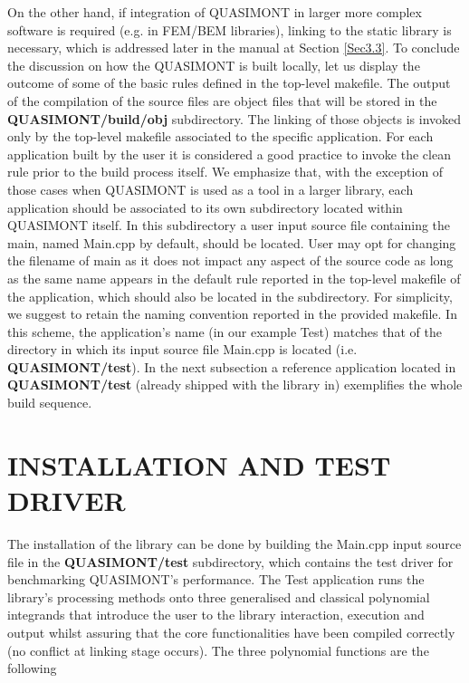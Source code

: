\documentclass[a4paper, twosided]{book}
\begin{document}
\noindent
On the other hand, if integration of QUASIMONT in larger more complex software is required (e.g. in FEM/BEM libraries), linking to the static library is necessary, which is addressed later in the manual at Section \ref{Sec3.3}. To conclude the discussion on how the QUASIMONT is built locally, let us display the outcome of some of the basic rules defined in the top-level \colorbox{poliGrayBlue}{makefile}. The output of the compilation of the source files are object files that will be stored in the \colorbox{poliGrayBlue}{\textbf{QUASIMONT/build/obj}} subdirectory. The linking of those objects is invoked only by the top-level makefile associated to the specific application. For each application built by the user it is considered a good practice to invoke the \colorbox{poliGrayBlue}{clean} rule prior to the build process itself. We emphasize that, with the exception of those cases when QUASIMONT is used as a tool in a larger library, each application should be associated to its own subdirectory located within QUASIMONT itself. In this subdirectory a user input source file containing the \colorbox{poliGrayBlue}{main}, named \colorbox{poliGrayBlue}{Main.cpp} by default, should be located. User may opt for changing the filename of \colorbox{poliGrayBlue}{main} as it does not impact any aspect of the source code as long as the same name appears in the \colorbox{poliGrayBlue}{default} rule reported in the top-level \colorbox{poliGrayBlue}{makefile} of the application, which should also be located in the subdirectory. For simplicity, we suggest to retain the naming convention reported in the provided \colorbox{poliGrayBlue}{makefile}. In this scheme, the application's name (in our example \colorbox{poliGrayBlue}{Test}) matches that of the directory in which its input source file \colorbox{poliGrayBlue}{Main.cpp} is located (i.e. \colorbox{poliGrayBlue}{\textbf{QUASIMONT/test}}). In the next subsection a reference application located in  \colorbox{poliGrayBlue}{\textbf{QUASIMONT/test}} (already shipped with the library in) exemplifies the whole build sequence.

\section[Installation and test driver]{\changefont INSTALLATION AND TEST DRIVER}\label{Sec2.4}

\noindent
The installation of the library can be done by building the \colorbox{poliGrayBlue}{Main.cpp} input source file in the \colorbox{poliGrayBlue}{\textbf{QUASIMONT/test}} subdirectory, which contains the test driver for benchmarking QUASIMONT's performance. The \colorbox{poliGrayBlue}{Test} application  runs the library's processing methods onto three generalised and classical polynomial integrands that introduce the user to the library interaction, execution and output whilst assuring that the core functionalities have been compiled correctly (no conflict at linking stage occurs). The three polynomial functions are the following
\end{document}
